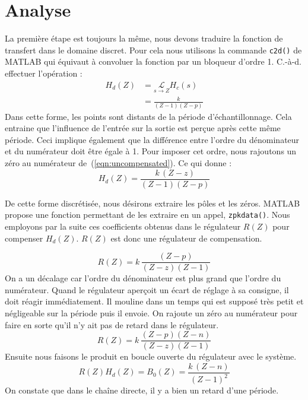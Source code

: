 \section{Analyse}
La première étape est toujours la même, nous devons traduire la fonction de transfert dans le domaine discret.
Pour cela nous utilisons la commande \texttt{c2d()} de MATLAB\textregistered{} qui équivaut à convoluer la fonction par un bloqueur d'ordre 1.
C.-à-d. effectuer l'opération :
\begin{align}
    H_d(Z) &= \underset{s\rightarrow Z}{\mathcal{L}} H_c(s) \\[2mm]
           &= \frac{k}{(Z-1)(Z-p)}
           \label{eqn:uncompensated}
\end{align}
Dans cette forme, les points sont distants de la période d'échantillonnage.
Cela entraine que l'influence de l'entrée sur la sortie est perçue après cette même période.
Ceci implique également que la différence entre l'ordre du dénominateur et du numérateur doit être égale à 1.
Pour imposer cet ordre, nous rajoutons un zéro au numérateur de~(\ref{eqn:uncompensated}).
Ce qui donne :
\begin{equation}
    H_d(Z) = \frac{k\,(Z-z)}{(Z-1)(Z-p)}
\end{equation}

De cette forme discrétisée, nous désirons extraire les pôles et les zéros.
MATLAB\textregistered{} propose une fonction permettant de les extraire en un appel, \texttt{zpkdata()}.
Nous employons par la suite ces coefficients obtenus dans le régulateur $R(Z)$ pour compenser $H_d(Z)$.
$R(Z)$ est donc une régulateur de compensation.

\begin{equation}
    R(Z) = k\,\frac{(Z-p)}{(Z-z)(Z-1)}
\end{equation}
On a un décalage car l'ordre du dénominateur est plus grand que l'ordre du numérateur.
Quand le régulateur aperçoit un écart de réglage à sa consigne, il doit réagir immédiatement.
Il \og{}mouline\fg{} dans un temps qui est supposé très petit et négligeable sur la période puis il envoie.
On rajoute un zéro au numérateur pour faire en sorte qu'il n'y ait pas de retard dans le régulateur.
\begin{equation}
    R(Z) = k\,\frac{(Z-p)(Z-n)}{(Z-z)(Z-1)}
\end{equation}
Ensuite nous faisons le produit en boucle ouverte du régulateur avec le système.
\begin{equation}
    R(Z)H_d(Z) = B_0(Z) = \frac{k\,(Z-n)}{(Z-1)^2}
\end{equation}
On constate que dans le chaîne directe, il y a bien un retard d'une période.

